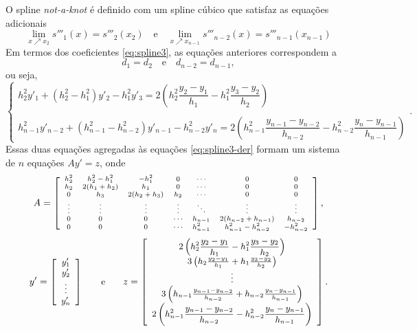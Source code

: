 O spline \textit{not-a-knot} é definido com um spline cúbico que satisfaz as equações adicionais
\begin{equation*}
	\lim\limits_{x\nearrow x_2 }s'''_1(x)=s'''_2(x_2)\quad\text{e}\quad	\lim\limits_{x\nearrow x_{n-1} }s'''_{n-2}(x)=s'''_{n-1}(x_{n-1})
\end{equation*}
Em termos dos coeficientes \eqref{eq:spline3}, as equações anteriores correspondem a 
\begin{equation*}
	d_1=d_2\quad\text{e}\quad d_{n-2}=d_{n-1},
\end{equation*}
ou seja,
\begin{equation*}
\left\{\begin{array}{l}
	h_2^2y'_1+(h_2^2-h_1^2)y'_2-h_1^2y'_3=2\left(h_2^2\dfrac{y_2-y_1}{h_1}-h_1^2\dfrac{y_3-y_2}{h_2}\right)\\
	\\
	h_{n-1}^2y'_{n-2}+(h_{n-1}^2-h_{n-2}^2)y'_{n-1}-h_{n-2}^2y'_n=2\left(h_{n-1}^2\dfrac{y_{n-1}-y_{n-2}}{h_{n-2}}-h_{n-2}^2\dfrac{y_n-y_{n-1}}{h_{n-1}}\right)
	\end{array}\right..
\end{equation*}
Essas duas equações agregadas às equações \eqref{eq:spline3-der} formam um sistema de $n$ equações $Ay' = z$, onde
\begin{equation*}
	\begin{scriptsize}
		A=\left[\begin{array}{ccccccc}
			h_2^2&h_2^2-h_1^2&-h_1^2&0&\cdots&0&0\\
			h_2&2(h_1+h_2)&h_1&0&\cdots&0&0\\
			0&h_3&2(h_2+h_3)&h_2&\cdots&0&0\\
			\vdots&\vdots&\vdots&\vdots&\ddots&\vdots&\vdots\\
			0&0&0&\cdots&h_{n-1} & 2(h_{n-2}+h_{n-1})&h_{n-2}\\
			0&0&0&\cdots &h_{n-1}^2&h_{n-1}^2-h_{n-2}^2&-h_{n-2}^2
		\end{array}\right],  
	\end{scriptsize} 
\end{equation*}
\begin{equation*}
	\begin{small}
		y'= \left[\begin{array}{c}
			y'_1\\
			y'_2\\
			\vdots\\
			y'_n
		\end{array}\right]\qquad \text{e}\qquad
		z = \left[\begin{array}{c}
			2\left(h_2^2\dfrac{y_2-y_1}{h_1}-h_1^2\dfrac{y_3-y_2}{h_2}\right)\\
			3\left(h_2\frac{y_2-y_1}{h_1}+h_1\frac{y_3-y_2}{h_2}\right)\\
			\vdots\\
			3\left(h_{n-1}\frac{y_{n-1}-y_{n-2}}{h_{n-2}}+h_{n-2}\frac{y_n-y_{n-1}}{h_{n-1}}\right)\\
			2\left(h_{n-1}^2\dfrac{y_{n-1}-y_{n-2}}{h_{n-2}}-h_{n-2}^2\dfrac{y_n-y_{n-1}}{h_{n-1}}\right)\\
		\end{array}\right].
	\end{small}
\end{equation*}
